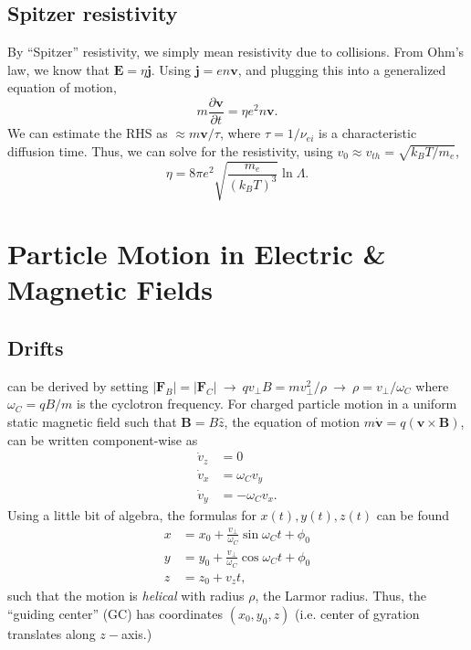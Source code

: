 	\subsection{Spitzer resistivity}
	By ``Spitzer'' resistivity, we simply mean resistivity due to collisions. From Ohm's law, we know that $\mathbf{E}=\eta\mathbf{j}$. Using $\mathbf{j}=en\mathbf{v}$, and plugging this into a generalized equation of motion,
	\begin{equation}
		m\frac{\partial \mathbf{v}}{\partial t} = \eta e^2n\mathbf{v}.
	\end{equation}
	We can estimate the RHS as $\approx m\mathbf{v}/\tau$, where $\tau=1/\nu_{ei}$ is a characteristic diffusion time. Thus, we can solve for the resistivity, using $v_0\approx v_{th}=\sqrt{k_BT/m_e}$,
	\begin{equation}
		\eta=8\pi e^2\sqrt{\frac{m_e}{(k_BT)^3}}\ln{\Lambda}.
	\end{equation}

\section{Particle Motion in Electric \& Magnetic Fields}

	\subsection{Drifts}

	 can be derived by setting $|\mathbf{F}_B|=|\mathbf{F}_C|~\rightarrow~qv_{\perp}B=mv_{\perp}^2/\rho~\rightarrow~\rho=v_{\perp}/\omega_C$ where $\omega_C=qB/m$ is the cyclotron frequency. For charged particle motion in a uniform static magnetic field such that $\mathbf{B}=B\hat{z}$, the equation of motion $m\dot{\mathbf{v}}=q(\mathbf{v}\times\mathbf{B})$, can be written component-wise as
	\begin{align}
		\dot{v}_z &= 0 \\[0.5em]
		\dot{v}_x &= \omega_Cv_y \\[0.5em]
		\dot{v}_y &= -\omega_Cv_x.
	\end{align}
	Using a little bit of algebra, the formulas for $x(t),y(t),z(t)$ can be found
	\begin{align}
		x &= x_0 + \frac{v_{\perp}}{\omega_C}\sin{\omega_Ct+\phi_0} \\[0.5em]
		y &= y_0 + \frac{v_{\perp}}{\omega_C}\cos{\omega_Ct+\phi_0} \\[0.5em]
		z &= z_0 + v_zt,
	\end{align}
	such that the motion is \textit{helical} with radius $\rho$, the Larmor radius. Thus, the ``guiding center'' (GC) has coordinates $(x_0,y_0,z)$ (i.e. center of gyration translates along $z-$axis.)

